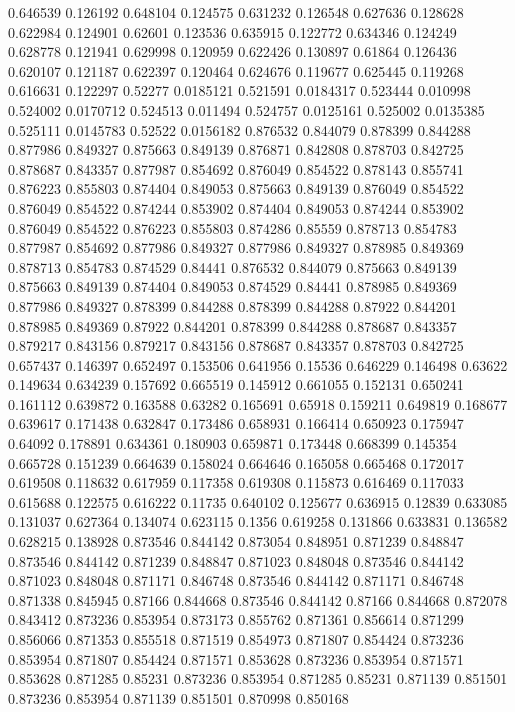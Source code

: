0.646539 0.126192
0.648104 0.124575
0.631232 0.126548
0.627636 0.128628
0.622984 0.124901
0.62601 0.123536
0.635915 0.122772
0.634346 0.124249
0.628778 0.121941
0.629998 0.120959
0.622426 0.130897
0.61864 0.126436
0.620107 0.121187
0.622397 0.120464
0.624676 0.119677
0.625445 0.119268
0.616631 0.122297
0.52277 0.0185121
0.521591 0.0184317
0.523444 0.010998
0.524002 0.0170712
0.524513 0.011494
0.524757 0.0125161
0.525002 0.0135385
0.525111 0.0145783
0.52522 0.0156182
0.876532 0.844079
0.878399 0.844288
0.877986 0.849327
0.875663 0.849139
0.876871 0.842808
0.878703 0.842725
0.878687 0.843357
0.877987 0.854692
0.876049 0.854522
0.878143 0.855741
0.876223 0.855803
0.874404 0.849053
0.875663 0.849139
0.876049 0.854522
0.876049 0.854522
0.874244 0.853902
0.874404 0.849053
0.874244 0.853902
0.876049 0.854522
0.876223 0.855803
0.874286 0.85559
0.878713 0.854783
0.877987 0.854692
0.877986 0.849327
0.877986 0.849327
0.878985 0.849369
0.878713 0.854783
0.874529 0.84441
0.876532 0.844079
0.875663 0.849139
0.875663 0.849139
0.874404 0.849053
0.874529 0.84441
0.878985 0.849369
0.877986 0.849327
0.878399 0.844288
0.878399 0.844288
0.87922 0.844201
0.878985 0.849369
0.87922 0.844201
0.878399 0.844288
0.878687 0.843357
0.879217 0.843156
0.879217 0.843156
0.878687 0.843357
0.878703 0.842725
0.657437 0.146397
0.652497 0.153506
0.641956 0.15536
0.646229 0.146498
0.63622 0.149634
0.634239 0.157692
0.665519 0.145912
0.661055 0.152131
0.650241 0.161112
0.639872 0.163588
0.63282 0.165691
0.65918 0.159211
0.649819 0.168677
0.639617 0.171438
0.632847 0.173486
0.658931 0.166414
0.650923 0.175947
0.64092 0.178891
0.634361 0.180903
0.659871 0.173448
0.668399 0.145354
0.665728 0.151239
0.664639 0.158024
0.664646 0.165058
0.665468 0.172017
0.619508 0.118632
0.617959 0.117358
0.619308 0.115873
0.616469 0.117033
0.615688 0.122575
0.616222 0.11735
0.640102 0.125677
0.636915 0.12839
0.633085 0.131037
0.627364 0.134074
0.623115 0.1356
0.619258 0.131866
0.633831 0.136582
0.628215 0.138928
0.873546 0.844142
0.873054 0.848951
0.871239 0.848847
0.873546 0.844142
0.871239 0.848847
0.871023 0.848048
0.873546 0.844142
0.871023 0.848048
0.871171 0.846748
0.873546 0.844142
0.871171 0.846748
0.871338 0.845945
0.87166 0.844668
0.873546 0.844142
0.87166 0.844668
0.872078 0.843412
0.873236 0.853954
0.873173 0.855762
0.871361 0.856614
0.871299 0.856066
0.871353 0.855518
0.871519 0.854973
0.871807 0.854424
0.873236 0.853954
0.871807 0.854424
0.871571 0.853628
0.873236 0.853954
0.871571 0.853628
0.871285 0.85231
0.873236 0.853954
0.871285 0.85231
0.871139 0.851501
0.873236 0.853954
0.871139 0.851501
0.870998 0.850168
